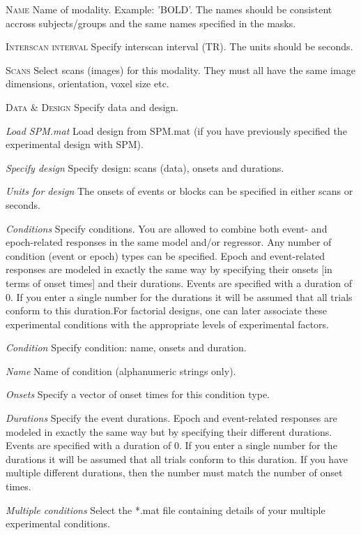 \textsc{Name}
Name of modality. Example: 'BOLD'. The names should be consistent accross subjects/groups and the same names specified in the masks.


\textsc{Interscan interval}
Specify interscan interval (TR). The units should be seconds.


\textsc{Scans}
Select scans (images) for this modality. They must all have the same image dimensions, orientation, voxel size etc.


\textsc{Data \& Design}
Specify data and design.


\textsl{Load SPM.mat}
Load design from SPM.mat (if you have previously specified the experimental design with SPM).


\textsl{Specify design}
Specify design: scans (data), onsets and durations.


\textit{Units for design}
The onsets of events or blocks can be specified in either scans or seconds.


\textit{Conditions}
Specify conditions. You are allowed to combine both event- and epoch-related responses in the same model and/or regressor. Any number of condition (event or epoch) types can be specified.  Epoch and event-related responses are modeled in exactly the same way by specifying their onsets [in terms of onset times] and their durations.  Events are specified with a duration of 0.  If you enter a single number for the durations it will be assumed that all trials conform to this duration.For factorial designs, one can later associate these experimental conditions with the appropriate levels of experimental factors.


\textit{Condition}
Specify condition: name, onsets and duration.


\textit{Name}
Name of condition (alphanumeric strings only).


\textit{Onsets}
Specify a vector of onset times for this condition type. 


\textit{Durations}
Specify the event durations. Epoch and event-related responses are modeled in exactly the same way but by specifying their different durations.  Events are specified with a duration of 0.  If you enter a single number for the durations it will be assumed that all trials conform to this duration. If you have multiple different durations, then the number must match the number of onset times.


\textit{Multiple conditions}
Select the *.mat file containing details of your multiple experimental conditions. 



